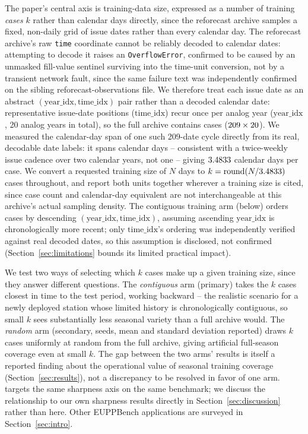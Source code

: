 The paper's central axis is training-data size, expressed as a number of
training \emph{cases} \(k\) rather than calendar days directly, since the
reforecast archive samples a fixed, non-daily grid of issue dates rather
than every calendar day. The reforecast archive's raw \texttt{time} coordinate cannot be reliably
decoded to calendar dates: attempting to decode it raises an
\texttt{OverflowError}, confirmed to be caused by an unmasked fill-value
sentinel surviving into the time-unit conversion, not by a transient
network fault, since the same failure text was independently confirmed on
the sibling reforecast-observations file. We therefore treat each issue
date as an abstract
\((\mathrm{year\_idx}, \mathrm{time\_idx})\) pair rather than a decoded
calendar date: \ReforecastTotalIssueDates{} representative issue-date
positions (\(\mathrm{time\_idx}\)) recur once per analog year
(\(\mathrm{year\_idx}\), 20 analog years in total), so the full archive
contains \FullArchiveCases{} cases (\(209 \times
20\)). We measured the calendar-day span of one such 209-date cycle
directly from its real, decodable date labels: it spans
\ReforecastIssueDateSpanDays{} calendar days --
consistent with a twice-weekly issue cadence over two calendar years, not
one -- giving \(3.4833\) calendar days per case. We convert a
requested training size of \(N\) days to \(k = \mathrm{round}(N /
3.4833)\) cases throughout, and report both units together wherever
a training size is cited, since case count and calendar-day equivalent are
not interchangeable at this archive's actual sampling density. The
contiguous training arm (below) orders cases by descending
\((\mathrm{year\_idx}, \mathrm{time\_idx})\), assuming ascending
\(\mathrm{year\_idx}\) is chronologically more recent; only
\(\mathrm{time\_idx}\)'s ordering was independently verified against real
decoded dates, so this assumption is disclosed, not confirmed
(Section~\ref{sec:limitations} bounds its limited practical impact).

We test two ways of selecting which \(k\) cases make up a given training
size, since they answer different questions. The \emph{contiguous} arm
(primary) takes the \(k\) cases closest in time to the test period,
working backward -- the realistic scenario for a newly deployed station
whose limited history is chronologically contiguous, so small \(k\) sees
substantially less seasonal variety than a full archive would. The
\emph{random} arm (secondary, \DataSizeSweepSeeds{} seeds, mean and
standard deviation reported) draws \(k\) cases uniformly at random from
the full archive, giving artificial full-season coverage even at small
\(k\). The gap between the two arms' results is itself a reported finding
about the operational value of seasonal training coverage
(Section~\ref{sec:results}), not a discrepancy to be resolved in favor of
one arm. \citet{baran_2026_sharpness_penalty} targets the same sharpness
axis on the same benchmark; we discuss the relationship to our own
sharpness results directly in Section~\ref{sec:discussion} rather than
here. Other EUPPBench applications are surveyed in
Section~\ref{sec:intro}.
